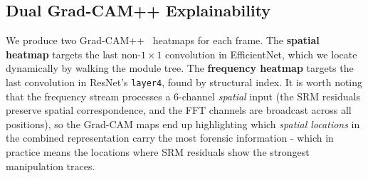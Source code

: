 \subsection{Dual Grad-CAM++ Explainability}
We produce two Grad-CAM++~\cite{chattopadhay2018gradcampp} heatmaps for each frame. The \textbf{spatial heatmap} targets the last non-$1\!\times\!1$ convolution in EfficientNet, which we locate dynamically by walking the module tree. The \textbf{frequency heatmap} targets the last convolution in ResNet's \texttt{layer4}, found by structural index. It is worth noting that the frequency stream processes a 6-channel \textit{spatial} input (the SRM residuals preserve spatial correspondence, and the FFT channels are broadcast across all positions), so the Grad-CAM maps end up highlighting which \textit{spatial locations} in the combined representation carry the most forensic information - which in practice means the locations where SRM residuals show the strongest manipulation traces.
